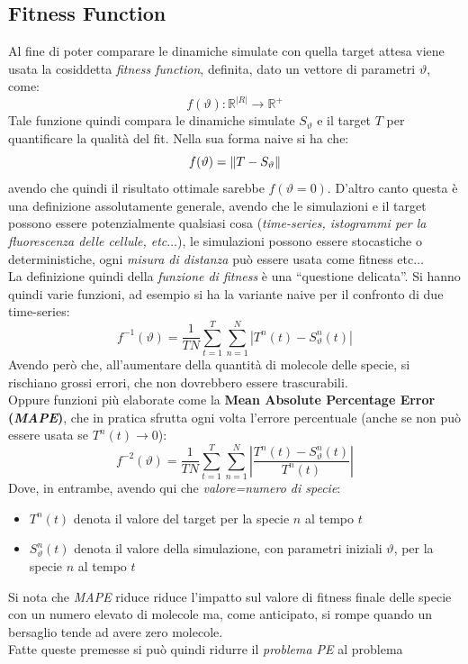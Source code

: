\documentclass[a4paper,12pt, oneside]{book}
\begin{document}
\subsection{Fitness Function}
Al fine di poter comparare le dinamiche simulate con quella target attesa viene
usata la cosiddetta \textit{fitness function}, definita, dato un vettore di
parametri $\vartheta$, come:
\[f(\vartheta):\mathbb{R}^{|R|}\to\mathbb{R}^{+}\]
Tale funzione quindi compara le dinamiche simulate $S_\vartheta$ e il target $T$
per quantificare la qualità del fit. Nella sua forma naive si ha che:
\[f(\vartheta)=\norm{T-S_\vartheta}\]
avendo che quindi il risultato ottimale sarebbe $f(\vartheta =0)$. D'altro canto
questa è una definizione assolutamente generale, avendo che le simulazioni e il
target possono essere potenzialmente qualsiasi cosa (\textit{time-series,
  istogrammi per la fluorescenza delle cellule, etc$\ldots$}), le simulazioni
possono essere stocastiche o deterministiche, ogni \textit{misura di distanza}
può essere usata come fitness etc$\ldots$\\
La definizione quindi della \textit{funzione di fitness} è una ``questione
delicata''. Si hanno quindi varie funzioni, ad esempio si ha la variante naive
per il confronto di due time-series:
\[f^{-1}(\vartheta)=\frac{1}{TN}\sum_{t=1}^T\sum_{n=1}^N|T^n(t)-S_\vartheta^n(t)|\]
Avendo però che, all'aumentare della quantità di molecole delle specie, si
rischiano grossi errori, che non dovrebbero essere trascurabili.\\
Oppure funzioni più elaborate come la \textbf{Mean Absolute Percentage Error
  (\textit{MAPE})}, che in pratica sfrutta ogni volta l'errore percentuale
(anche se non può essere usata se $T^n(t)\to 0$):
\[f^{-2}(\vartheta)=\frac{1}{TN}\sum_{t=1}^T\sum_{n=1}^N\left|
    \frac{T^n(t)-S_\vartheta^n(t)}{T^n(t)}\right|\] 
Dove, in entrambe, avendo qui che \textit{valore=numero di specie}:
\begin{itemize}
  \item $T^n(t)$ denota il valore del target per la specie $n$ al tempo $t$
  \item $S_\vartheta^n(t)$ denota il valore della simulazione, con parametri
  iniziali $\vartheta$, per la specie $n$ al tempo $t$
\end{itemize}
Si nota che \textit{MAPE} riduce riduce l'impatto sul valore di fitness finale
delle specie con un numero elevato di molecole ma, come anticipato, si rompe
quando un bersaglio tende ad avere zero molecole.\\
Fatte queste premesse si può quindi ridurre il \textit{problema PE} al problema
\end{document}
